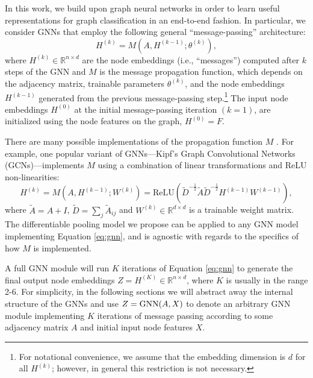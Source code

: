 In this work, we build upon graph neural networks in order to learn useful representations for graph classification in an end-to-end fashion. 
In particular, we consider GNNs that employ the following general ``message-passing'' architecture:
\begin{equation}\label{eq:gnn}
     H^{(k)} = M(A,H^{(k-1)};\theta^{(k)}),
\end{equation}
where $H^{(k)} \in \mathbb{R}^{n \times d}$ are the node embeddings (i.e., ``messages'') computed after $k$ steps of the GNN and $M$ is the message propagation function, which depends on the adjacency matrix, trainable parameters $\theta^{(k)}$, and the node embeddings $H^{(k-1)}$ generated from the previous message-passing step.\footnote{For notational convenience, we assume that the embedding dimension is $d$ for all $H^{(k)}$; however, in general this restriction is not necessary.}
The input node embeddings $H^{(0)}$ at the initial message-passing iteration $(k=1)$, are initialized using
the node features on the graph, $H^{(0)} = F$. 

There are many possible implementations of the propagation function $M$ \cite{Gil+2017,hamilton2017inductive}.
For example, one popular variant of GNNs---Kipf's \etal \cite{kipf2017semi} Graph Convolutional Networks (GCNs)---implements $M$ using a combination of linear transformations and ReLU non-linearities:
\begin{equation}
    \label{eq:gcn}
    H^{(k)} =  M(A,H^{(k-1)};W^{(k)}) = \textrm{ReLU}(\tilde{D}^{-\frac{1}{2}}\tilde{A}\tilde{D}^{-\frac{1}{2}} H^{(k-1)} W^{(k-1)}),
\end{equation}
where $\tilde{A}=A+I$, $\tilde{D}=\sum_j\tilde{A}_{ij}$ and $W^{(k)} \in \mathbb{R}^{d \times d}$ is a trainable weight matrix.
The differentiable pooling model we propose can be applied to any GNN model implementing Equation \eqref{eq:gnn}, and is agnostic with regards to the specifics of how $M$ is implemented. 

A full GNN module will run $K$ iterations of Equation \eqref{eq:gnn} to generate the final output node embeddings $Z=H^{(K)} \in \mathbb{R}^{n \times d}$, where $K$ is usually in the range 2-6.
For simplicity, in the following sections we will abstract away the internal structure of the GNNs and use $Z = \textrm{GNN}(A, X)$ to denote an arbitrary GNN module implementing $K$ iterations of message passing according to some adjacency matrix $A$ and initial input node features $X$. 

